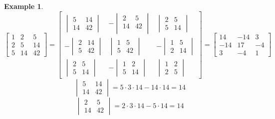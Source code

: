 \documentclass[a4paper,landscape,twocolumn]{article}
\newtheorem{ex}{Example}
\begin{document}
\begin{ex}
  \[
    \begin{bmatrix}
      1 & 2 & 5 \\
      2 & 5 & 14 \\
      5 & 14 & 42
    \end{bmatrix}
    =
    \begin{bmatrix}
      \begin{vmatrix}
        5 & 14 \\
        14 & 42
      \end{vmatrix} &
      - \begin{vmatrix}
        2 & 5 \\
        14 & 42 \\
      \end{vmatrix} &
      \begin{vmatrix}
        2 & 5 \\
        5 & 14
      \end{vmatrix} \\
      -\begin{vmatrix}
        2 & 14 \\
        5 & 42
      \end{vmatrix} &
      \begin{vmatrix}
        1 & 5 \\
        5 & 42
      \end{vmatrix} &
      -\begin{vmatrix}
        1 & 5 \\
        2 & 14
      \end{vmatrix} \\
      \begin{vmatrix}
        2 & 5 \\
        5 & 14
      \end{vmatrix} &
      -\begin{vmatrix}
        1 & 2 \\
        5 & 14
      \end{vmatrix} &
      \begin{vmatrix}
        1 & 2 \\
        2 & 5
      \end{vmatrix}
    \end{bmatrix}
    = \begin{bmatrix}
      14 & -14 & 3 \\
      -14 & 17 & -4 \\
      3 & -4 & 1
    \end{bmatrix}
  \] \[
    \begin{vmatrix}
      5 & 14 \\
      14 & 42
    \end{vmatrix}
    = 5 \cdot 3 \cdot 14
    - 14 \cdot 14 = 14
  \] \[
    \begin{vmatrix}
      2 & 5 \\
      14 & 42
    \end{vmatrix}
    = 2 \cdot 3 \cdot 14
    - 5 \cdot 14 = 14
  \]
\end{ex}
\end{document}
